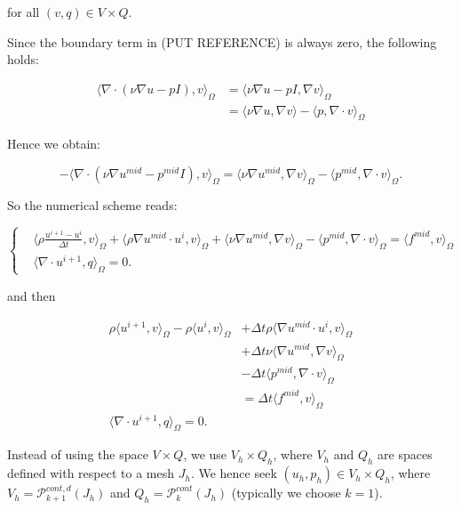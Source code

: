 \documentclass[11pt,a4paper,titlepage]{report}
\begin{document}
for all $(v,q) \in V \times Q$.

Since the boundary term in (PUT REFERENCE) is always zero, the following holds:

\[
\begin{aligned}
\langle \nabla \cdot (\nu \nabla u - pI) ,v \rangle_\Omega & = \langle \nu \nabla u - pI ,\nabla v \rangle_\Omega \\
														& = \langle \nu \nabla u  ,\nabla v \rangle  - \langle p ,\nabla \cdot v \rangle_\Omega
\end{aligned}
\]

Hence we obtain:

\[
- \langle \nabla \cdot (\nu \nabla u^{mid} - p^{mid}I) ,v \rangle_{\Omega} = \langle \nu \nabla u^{mid}, \nabla v \rangle_\Omega -  \langle p^{mid}, \nabla \cdot v \rangle_\Omega.
\]

So the numerical scheme reads:

\[
\left\{
\begin{aligned}
& \langle \rho \frac{u^{i+1} - u^i}{\Delta t},v \rangle_\Omega
+ \langle \rho \nabla u^{mid} \cdot u^i  ,v \rangle_\Omega
+ \langle \nu \nabla u^{mid}, \nabla v \rangle_\Omega
- \langle p^{mid} , \nabla \cdot v \rangle_\Omega = \langle f^{mid} ,v \rangle_\Omega \\
& \langle \nabla \cdot u^{i+1},q \rangle_\Omega =  0.
\end{aligned}
\right.
\]

and then

\[
\begin{aligned}
\rho \langle u^{i+1},v \rangle_\Omega - \rho \langle u^i, v \rangle_\Omega & + \Delta t \rho \langle \nabla u^{mid} \cdot u^i  ,v \rangle_\Omega \\
& + \Delta t \nu \langle \nabla u^{mid}, \nabla v \rangle_\Omega \\
& - \Delta t \langle p^{mid} , \nabla \cdot v \rangle_\Omega \\
& = \Delta t \langle f^{mid} ,v \rangle_\Omega \\
\langle \nabla \cdot u^{i+1},q \rangle_\Omega  = 0.
\end{aligned}
\]

Instead of using the space $V \times Q$, we use $V_h \times Q_h$, where $V_h$ and $Q_h$ are spaces defined with respect to a mesh $J_h$. We hence seek $(u_h, p_h) \in V_h \times Q_h$, where $V_h = \mathcal{P}^{cont,d}_{k+1} (J_h)$ and $Q_h = \mathcal{P}^{cont}_{k} (J_h)$ (typically we choose $k=1$). \\
\end{document}
